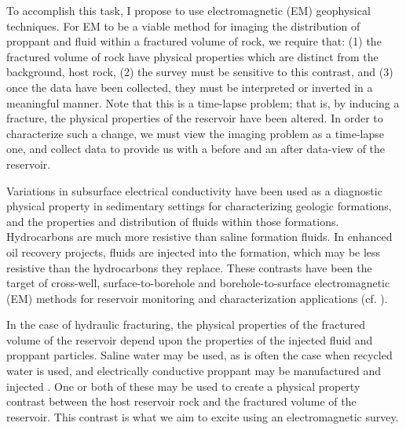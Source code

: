 

To accomplish this task, I propose to use electromagnetic (EM) geophysical techniques. For EM to be a viable method for imaging the distribution of proppant and fluid within a fractured volume of rock, we require that: (1) the fractured volume of rock have physical properties which are distinct from the background, host rock, (2) the survey must be sensitive to this contrast, and (3) once the data have been collected, they must be interpreted or inverted in a meaningful manner. Note that this is a time-lapse problem; that is, by inducing a fracture, the physical properties of the reservoir have been altered. In order to characterize such a change, we must view the imaging problem as a time-lapse one, and collect data to provide us with a before and an after data-view of the reservoir.

Variations in subsurface electrical conductivity have been used as a diagnostic physical property in sedimentary settings for characterizing geologic formations, and the properties and distribution of fluids within those formations. Hydrocarbons are much more resistive than saline formation fluids. In enhanced oil recovery projects, fluids are injected into the formation, which may be less resistive than the hydrocarbons they replace. These contrasts have been the target of cross-well, surface-to-borehole and borehole-to-surface electromagnetic (EM) methods for reservoir monitoring and characterization applications (cf. \cite{Bevc1991, Wilt1995, marsala2008, marsala2011, Marsala2014}).

In the case of hydraulic fracturing, the physical properties of the fractured volume of the reservoir depend upon the properties of the injected fluid and proppant particles. Saline water may be used, as is often the case when recycled water is used, and electrically conductive proppant may be manufactured and injected \citep{cannan2014electrically, Vengosh2014, King2010}. One or both of these may be used to create a physical property contrast between the host reservoir rock and the fractured volume of the reservoir. This contrast is what we aim to excite using an electromagnetic survey.

